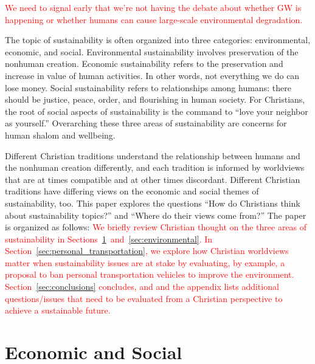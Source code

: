 \documentclass[12pt]{article}
\newcommand{\ins}[1]{\textcolor{red}{#1}}
\begin{document}
\ins{We need to signal early that we're not having the debate about whether
GW is happening or whether humans can cause large-scale environmental degradation.}

The topic of sustainability is often organized into three categories: 
environmental, economic, and social. 
Environmental sustainability involves preservation of the nonhuman creation.
Economic sustainability refers to
the preservation and increase in value of human activities. 
In other words, not everything we do can lose money. 
Social sustainability refers to relationships among humans: 
there should be justice, peace, order, and flourishing in human society. 
For Christians, the root of social aspects of sustainability
is the command to ``love your neighbor as yourself.'' 
Overarching these three areas of sustainability are 
concerns for human shalom and wellbeing.

Different Christian traditions understand the relationship 
between humans and the nonhuman creation differently, and
each tradition is informed by worldviews 
that are at times compatible and at other times discordant. 
Different Christian traditions have differing views 
on the economic and social themes of sustainability, too.
This paper explores the questions 
``How do Christians think about sustainability topics?'' 
and 
``Where do their views come from?'' 
The paper is organized as follows:
\ins{We briefly review Christian thought on the three areas of sustainability
in Sections~\ref{sec:economic}~and~\ref{sec:environmental}.
In Section~\ref{sec:personal_transportation}, 
we explore how Christian worldviews matter 
when sustainability issues are at stake
by evaluating, by example, a proposal to ban personal transportation vehicles
to improve the environment.
Section~\ref{sec:conclusions} concludes, and
and the appendix lists additional questions/issues 
that need to be evaluated from a Christian perspective to achieve a sustainable future.}


\section{Economic and Social}
\label{sec:economic}
\end{document}
